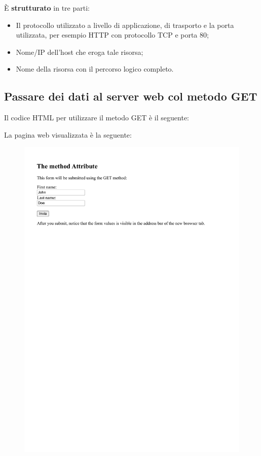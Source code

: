\documentclass[a4paper]{article}
\begin{document}
	\noindent
	È \textbf{strutturato} in tre parti:
	\begin{itemize}
		\item Il protocollo utilizzato a livello di applicazione, di trasporto e la porta utilizzata, per esempio HTTP con protocollo TCP e porta 80;
		
		\item Nome/IP dell'host che eroga tale risorsa;
		
		\item Nome della risorsa con il percorso logico completo.
	\end{itemize}\newpage
	
	\subsection{Passare dei dati al server web col metodo GET}
	
	Il codice HTML per utilizzare il metodo GET è il seguente:
	
	La pagina web visualizzata è la seguente:
	\begin{figure}[!htp]
		\centering
		\includegraphics[width=\textwidth]{img/form-get.pdf}
	\end{figure}
	
\end{document}
